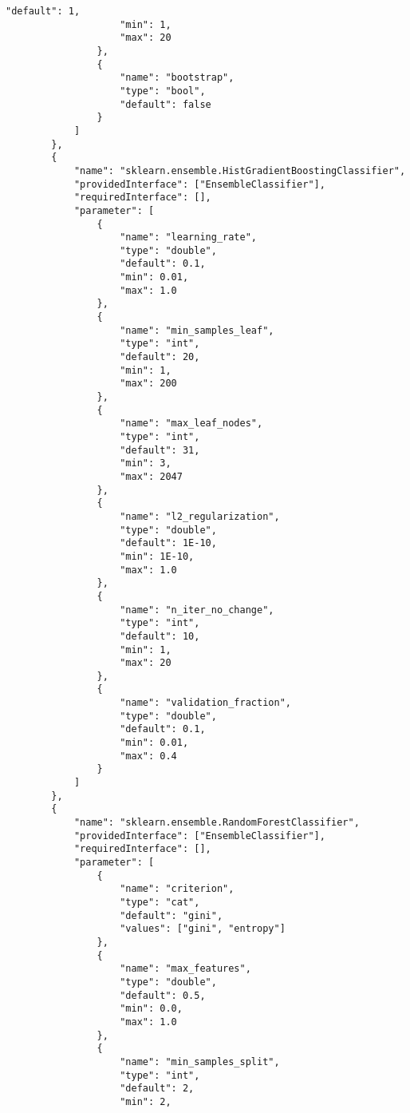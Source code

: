 \begin{Verbatim}[fontsize=\scriptsize]
                    "default": 1,
                    "min": 1,
                    "max": 20
                },
                {
                    "name": "bootstrap",
                    "type": "bool",
                    "default": false
                }
            ]
        },
        {
            "name": "sklearn.ensemble.HistGradientBoostingClassifier",
            "providedInterface": ["EnsembleClassifier"],
            "requiredInterface": [],
            "parameter": [
                {
                    "name": "learning_rate",
                    "type": "double",
                    "default": 0.1,
                    "min": 0.01,
                    "max": 1.0
                },
                {
                    "name": "min_samples_leaf",
                    "type": "int",
                    "default": 20,
                    "min": 1,
                    "max": 200
                },
                {
                    "name": "max_leaf_nodes",
                    "type": "int",
                    "default": 31,
                    "min": 3,
                    "max": 2047
                },
                {
                    "name": "l2_regularization",
                    "type": "double",
                    "default": 1E-10,
                    "min": 1E-10,
                    "max": 1.0
                },
                {
                    "name": "n_iter_no_change",
                    "type": "int",
                    "default": 10,
                    "min": 1,
                    "max": 20
                },
                {
                    "name": "validation_fraction",
                    "type": "double",
                    "default": 0.1,
                    "min": 0.01,
                    "max": 0.4
                }
            ]
        },
        {
            "name": "sklearn.ensemble.RandomForestClassifier",
            "providedInterface": ["EnsembleClassifier"],
            "requiredInterface": [],
            "parameter": [
                {
                    "name": "criterion",
                    "type": "cat",
                    "default": "gini",
                    "values": ["gini", "entropy"]
                },
                {
                    "name": "max_features",
                    "type": "double",
                    "default": 0.5,
                    "min": 0.0,
                    "max": 1.0
                },
                {
                    "name": "min_samples_split",
                    "type": "int",
                    "default": 2,
                    "min": 2,

\end{Verbatim}
